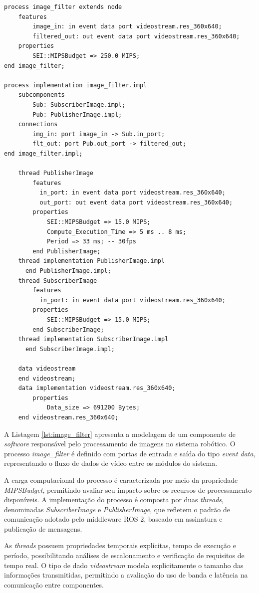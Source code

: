 \begin{lstlisting}[caption={Exemplo de especificação de componente de software em AADL}, label={lst:image_filter}]
process image_filter extends node
    features
        image_in: in event data port videostream.res_360x640;
        filtered_out: out event data port videostream.res_360x640;
    properties
        SEI::MIPSBudget => 250.0 MIPS;
end image_filter;

process implementation image_filter.impl
    subcomponents
        Sub: SubscriberImage.impl;
        Pub: PublisherImage.impl;
    connections
        img_in: port image_in -> Sub.in_port;
        flt_out: port Pub.out_port -> filtered_out;
end image_filter.impl;

	thread PublisherImage
		features
		  in_port: in event data port videostream.res_360x640;
	      out_port: out event data port videostream.res_360x640;
	    properties
			SEI::MIPSBudget => 15.0 MIPS;
			Compute_Execution_Time => 5 ms .. 8 ms;
   			Period => 33 ms; -- 30fps
  		end PublisherImage;
	thread implementation PublisherImage.impl
	  end PublisherImage.impl;
	thread SubscriberImage
	    features
	      in_port: in event data port videostream.res_360x640;
	    properties
			SEI::MIPSBudget => 15.0 MIPS;
  		end SubscriberImage;
	thread implementation SubscriberImage.impl
	  end SubscriberImage.impl;

    data videostream
    end videostream;
    data implementation videostream.res_360x640;
		properties
			Data_size => 691200 Bytes;
	end videostream.res_360x640;

\end{lstlisting}


A Listagem \ref{lst:image_filter} apresenta a modelagem de um componente de \textit{software} responsável pelo processamento de imagens no sistema robótico. O processo \textit{image\_filter} é definido com portas de entrada e saída do tipo \textit{event data}, representando o fluxo de dados de vídeo entre os módulos do sistema.

A carga computacional do processo é caracterizada por meio da propriedade \textit{MIPSBudget}, permitindo avaliar seu impacto sobre os recursos de processamento disponíveis. A implementação do processo é composta por duas \textit{threads}, denominadas \textit{SubscriberImage} e \textit{PublisherImage}, que refletem o padrão de comunicação adotado pelo middleware ROS 2, baseado em assinatura e publicação de mensagens.

As \textit{threads} possuem propriedades temporais explícitas, tempo de execução e período, possibilitando análises de escalonamento e verificação de requisitos de tempo real. O tipo de dado \textit{videostream} modela explicitamente o tamanho das informações transmitidas, permitindo a avaliação do uso de banda e latência na comunicação entre componentes.

